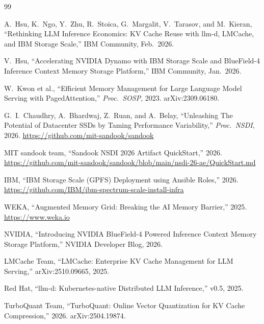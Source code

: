 \documentclass[11pt,letterpaper]{article}
\begin{document}
\begin{thebibliography}{99}

A.~Hsu, K.~Ngo, Y.~Zhu, R.~Stoica, G.~Margalit, V.~Tarasov, and M.~Kieran, ``Rethinking LLM Inference Economics: KV Cache Reuse with llm-d, LMCache, and IBM Storage Scale,'' IBM Community, Feb.\ 2026.

V.~Hsu, ``Accelerating NVIDIA Dynamo with IBM Storage Scale and BlueField-4 Inference Context Memory Storage Platform,'' IBM Community, Jan.\ 2026.

W.~Kwon et al., ``Efficient Memory Management for Large Language Model Serving with PagedAttention,'' \emph{Proc.\ SOSP}, 2023. arXiv:2309.06180.

G.~I.~Chaudhry, A.~Bhardwaj, Z.~Ruan, and A.~Belay, ``Unleashing The Potential of Datacenter SSDs by Taming Performance Variability,'' \emph{Proc.\ NSDI}, 2026. \url{https://github.com/mit-sandook/sandook}

MIT sandook team, ``Sandook NSDI 2026 Artifact QuickStart,'' 2026. \url{https://github.com/mit-sandook/sandook/blob/main/nsdi-26-ae/QuickStart.md}

IBM, ``IBM Storage Scale (GPFS) Deployment using Ansible Roles,'' 2026. \url{https://github.com/IBM/ibm-spectrum-scale-install-infra}

WEKA, ``Augmented Memory Grid: Breaking the AI Memory Barrier,'' 2025. \url{https://www.weka.io}

NVIDIA, ``Introducing NVIDIA BlueField-4 Powered Inference Context Memory Storage Platform,'' NVIDIA Developer Blog, 2026.

LMCache Team, ``LMCache: Enterprise KV Cache Management for LLM Serving,'' arXiv:2510.09665, 2025.

Red Hat, ``llm-d: Kubernetes-native Distributed LLM Inference,'' v0.5, 2025.

TurboQuant Team, ``TurboQuant: Online Vector Quantization for KV Cache Compression,'' 2026. arXiv:2504.19874.

\end{thebibliography}
\end{document}
